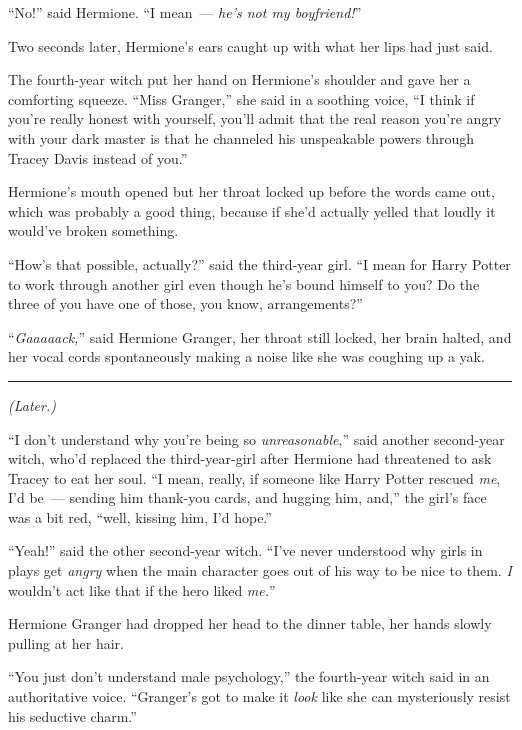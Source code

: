 ``No!'' said Hermione. ``I mean~--- \emph{he's not my boyfriend!}''

Two seconds later, Hermione's ears caught up with what her lips had just said.

The fourth-year witch put her hand on Hermione's shoulder and gave her a comforting squeeze. ``Miss Granger,'' she said in a soothing voice, ``I think if you're really honest with yourself, you'll admit that the real reason you're angry with your dark master is that he channeled his unspeakable powers through Tracey Davis instead of you.''

Hermione's mouth opened but her throat locked up before the words came out, which was probably a good thing, because if she'd actually yelled that loudly it would've broken something.

``How's that possible, actually?'' said the third-year girl. ``I mean for Harry Potter to work through another girl even though he's bound himself to you? Do the three of you have one of those, you know, arrangements?''

``\emph{Gaaaaack,}'' said Hermione Granger, her throat still locked, her brain halted, and her vocal cords spontaneously making a noise like she was coughing up a yak.

\begin{center}\rule{3in}{0.4pt}\end{center}

\emph{(Later.)}

``I don't understand why you're being so \emph{unreasonable},'' said another second-year witch, who'd replaced the third-year-girl after Hermione had threatened to ask Tracey to eat her soul. ``I mean, really, if someone like Harry Potter rescued \emph{me}, I'd be~--- sending him thank-you cards, and hugging him, and,'' the girl's face was a bit red, ``well, kissing him, I'd hope.''

``Yeah!'' said the other second-year witch. ``I've never understood why girls in plays get \emph{angry} when the main character goes out of his way to be nice to them. \emph{I} wouldn't act like that if the hero liked \emph{me.}''

Hermione Granger had dropped her head to the dinner table, her hands slowly pulling at her hair.

``You just don't understand male psychology,'' the fourth-year witch said in an authoritative voice. ``Granger's got to make it \emph{look} like she can mysteriously resist his seductive charm.''

